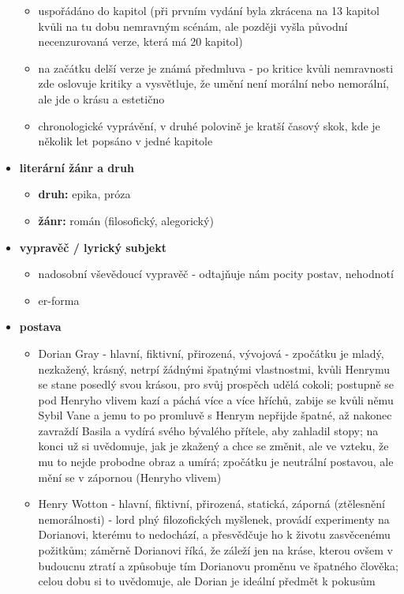\documentclass[11pt]{article}
\begin{document}
\begin{itemize}
\begin{itemize}
            \item uspořádáno do kapitol (při prvním vydání byla zkrácena na 13 kapitol kvůli na tu dobu nemravným scénám, ale později vyšla původní necenzurovaná verze, která má 20 kapitol)
            \item na začátku delší verze je známá předmluva - po kritice kvůli nemravnosti zde oslovuje kritiky a vysvětluje, že umění není morální nebo nemorální, ale jde o krásu a estetično
            \item chronologické vyprávění, v druhé polovině je kratší časový skok, kde je několik let popsáno v jedné kapitole
        \end{itemize}
        \item\textbf{literární žánr a druh}
        \begin{itemize}
            \item\textbf{druh: }epika, próza
            \item\textbf{žánr: }román (filosofický, alegorický)
        \end{itemize}
        \item\textbf{vypravěč / lyrický subjekt}
        \begin{itemize}
            \item nadosobní vševědoucí vypravěč - odtajňuje nám pocity postav, nehodnotí
            \item er-forma
        \end{itemize}
        \item\textbf{postava}
        \begin{itemize}
            \item Dorian Gray - hlavní, fiktivní, přirozená, vývojová - zpočátku je mladý, nezkažený, krásný, netrpí žádnými špatnými vlastnostmi, kvůli Henrymu se stane posedlý svou krásou, pro svůj prospěch udělá cokoli; postupně se pod Henryho vlivem kazí a páchá více a více hříchů, zabije se kvůli němu Sybil Vane a jemu to po promluvě s Henrym nepřijde špatné, až nakonec zavraždí Basila a vydírá svého bývalého přítele, aby zahladil stopy; na konci už si uvědomuje, jak je zkažený a chce se změnit, ale ve vzteku, že mu to nejde probodne obraz a umírá; zpočátku je neutrální postavou, ale mění se v zápornou (Henryho vlivem)
            \item Henry Wotton - hlavní, fiktivní, přirozená, statická, záporná (ztělesnění nemorálnosti) - lord plný filozofických myšlenek, provádí experimenty na Dorianovi, kterému to nedochází, a přesvědčuje ho k životu zasvěcenému požitkům; záměrně Dorianovi říká, že záleží jen na kráse, kterou ovšem v budoucnu ztratí a způsobuje tím Dorianovu proměnu ve špatného člověka; celou dobu si to uvědomuje, ale Dorian je ideální předmět k pokusům

\end{itemize}
\end{itemize}
\end{document}

